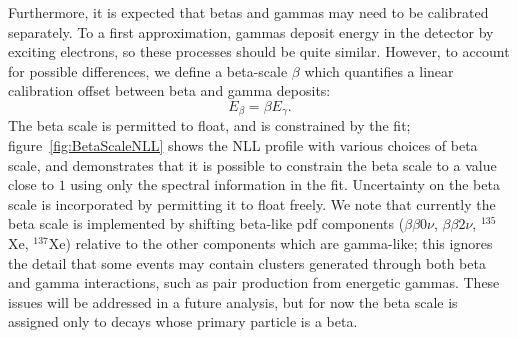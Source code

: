 Furthermore, it is expected that betas and gammas may need to be calibrated separately.  To a first approximation, gammas deposit energy in the detector by exciting electrons, so these processes should be quite similar.  However, to account for possible differences, we define a beta-scale $\beta$ which quantifies a linear calibration offset between beta and gamma deposits:
\begin{equation}
E_\beta = \beta E_\gamma.
\end{equation}
The beta scale is permitted to float, and is constrained by the fit; figure~\ref{fig:BetaScaleNLL} shows the NLL profile with various choices of beta scale, and demonstrates that it is possible to constrain the beta scale to a value close to $1$ using only the spectral information in the fit.  Uncertainty on the beta scale is incorporated by permitting it to float freely.  We note that currently the beta scale is implemented by shifting beta-like pdf components ($\beta\beta 0\nu$, $\beta\beta 2\nu$, $^{135}$Xe, $^{137}$Xe) relative to the other components which are gamma-like; this ignores the detail that some events may contain clusters generated through both beta and gamma interactions, such as pair production from energetic gammas.  These issues will be addressed in a future analysis, but for now the beta scale is assigned only to decays whose primary particle is a beta.~\cite{FittingDocument}

